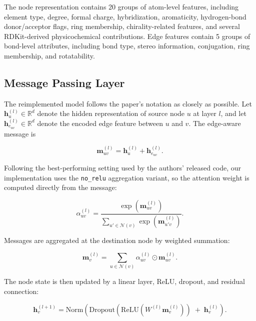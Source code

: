 The node representation contains 20 groups of atom-level features, including element type, degree, formal charge, hybridization, aromaticity, hydrogen-bond donor/acceptor flags, ring membership, chirality-related features, and several RDKit-derived physicochemical contributions. Edge features contain 5 groups of bond-level attributes, including bond type, stereo information, conjugation, ring membership, and rotatability.

\subsection{Message Passing Layer}

The reimplemented model follows the paper's notation as closely as possible. Let
\(
\mathbf{h}^{(l)}_u \in \mathbb{R}^d
\)
denote the hidden representation of source node \(u\) at layer \(l\), and let
\(
\mathbf{h}^{(l)}_{e_{uv}} \in \mathbb{R}^d
\)
denote the encoded edge feature between \(u\) and \(v\). The edge-aware message is

\begin{equation}
    \mathbf{m}^{(l)}_{uv} = \mathbf{h}^{(l)}_u + \mathbf{h}^{(l)}_{e_{uv}} .
\end{equation}

Following the best-performing setting used by the authors' released code, our implementation uses the \texttt{no\_relu} aggregation variant, so the attention weight is computed directly from the message:

\begin{equation}
    \alpha^{(l)}_{uv} =
    \frac{\exp \left( \mathbf{m}^{(l)}_{uv} \right)}
    {\sum\limits_{u' \in \mathcal{N}(v)} \exp \left( \mathbf{m}^{(l)}_{u'v} \right)} .
\end{equation}

Messages are aggregated at the destination node by weighted summation:

\begin{equation}
    \mathbf{m}^{(l)}_v =
    \sum\limits_{u \in \mathcal{N}(v)}
    \alpha^{(l)}_{uv} \odot \mathbf{m}^{(l)}_{uv} .
\end{equation}

The node state is then updated by a linear layer, ReLU, dropout, and residual connection:

\begin{equation}
    \mathbf{h}^{(l+1)}_v =
    \mathrm{Norm}
    \left(
    \mathrm{Dropout}
    \left(
        \mathrm{ReLU}
        \left(
            W^{(l)} \mathbf{m}^{(l)}_v
            \right)
        \right)
    \;+\;
    \mathbf{h}^{(l)}_v
    \right).
\end{equation}

